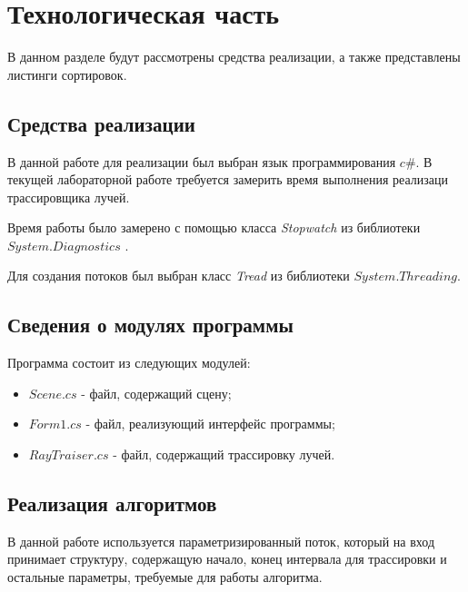 \chapter{Технологическая часть}
В данном разделе будут рассмотрены средства реализации, а также представлены листинги сортировок.
\section{Средства реализации}
В данной работе для реализации был выбран язык программирования $c\#$. В текущей лабораторной работе требуется замерить время выполнения реализаци трассировщика лучей.

Время работы было замерено с помощью класса \textit{Stopwatch} из библиотеки $System.Diagnostics$ \cite{time}. 

Для создания потоков был выбран класс \textit{Tread} из библиотеки $System.Threading$.

\section{Сведения о модулях программы}
Программа состоит из следующих модулей:
\begin{itemize}
	\item $Scene.cs$ - файл, содержащий сцену;
	\item $Form1.cs$ - файл, реализующий интерфейс программы;
	\item $RayTraiser.cs$ - файл, содержащий трассировку лучей.
\end{itemize}

\section{Реализация алгоритмов}
В данной работе используется параметризированный поток, который на вход \newpage принимает структуру, содержащую начало, конец интервала для трассировки и остальные параметры, требуемые для работы алгоритма.


